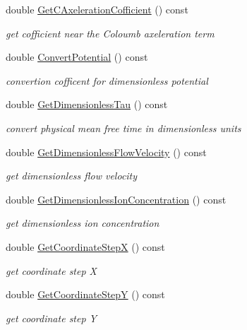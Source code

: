 \begin{DoxyCompactItemize}
double \mbox{\hyperlink{classconverter_a6701071c81bc345e3cfa096bebfeb291}{Get\+C\+Axeleration\+Cofficient}} () const
\begin{DoxyCompactList}\small\item\em get cofficient near the Coloumb axeleration term \end{DoxyCompactList}\item 
double \mbox{\hyperlink{classconverter_a52660e55a0c282351a0a764787587f79}{Convert\+Potential}} () const
\begin{DoxyCompactList}\small\item\em convertion cofficent for dimensionless potential \end{DoxyCompactList}\item 
double \mbox{\hyperlink{classconverter_ac72a868ef0a7141d08db58a5cdb27c58}{Get\+Dimensionless\+Tau}} () const
\begin{DoxyCompactList}\small\item\em convert physical mean free time in dimensionless units \end{DoxyCompactList}\item 
double \mbox{\hyperlink{classconverter_a89fabf7b30a0009ff92378357549846d}{Get\+Dimensionless\+Flow\+Velocity}} () const
\begin{DoxyCompactList}\small\item\em get dimensionless flow velocity \end{DoxyCompactList}\item 
double \mbox{\hyperlink{classconverter_aa856f42e3c480e1c0132fbd83c2b95e2}{Get\+Dimensionless\+Ion\+Concentration}} () const
\begin{DoxyCompactList}\small\item\em get dimensionless ion concentration \end{DoxyCompactList}\item 
double \mbox{\hyperlink{classconverter_a3b867cd7429ebf9227a2c9442bb25124}{Get\+Coordinate\+StepX}} () const
\begin{DoxyCompactList}\small\item\em get coordinate step X \end{DoxyCompactList}\item 
double \mbox{\hyperlink{classconverter_acaf40a138024b759fb53b58257a57c32}{Get\+Coordinate\+StepY}} () const
\begin{DoxyCompactList}\small\item\em get coordinate step Y \end{DoxyCompactList}\item 

\end{DoxyCompactItemize}
